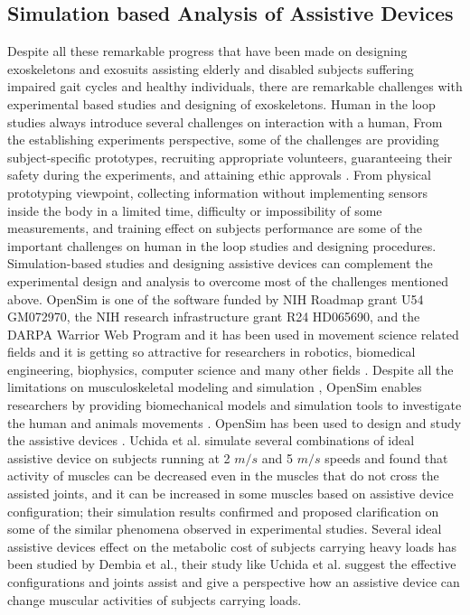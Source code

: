 \documentclass[10pt,letterpaper]{article}
\begin{document}
\subsection*{Simulation based Analysis of Assistive Devices}
Despite all these remarkable progress that have been made on designing exoskeletons and exosuits assisting elderly and disabled subjects suffering impaired gait cycles and healthy individuals, there are remarkable challenges with experimental based studies and designing of exoskeletons. Human in the loop studies always introduce several challenges on interaction with a human, From the establishing experiments perspective, some of the challenges are providing subject-specific prototypes, recruiting appropriate volunteers, guaranteeing their safety during the experiments, and attaining ethic approvals \cite{2}. From physical prototyping viewpoint, collecting information without implementing sensors inside the body in a limited time\cite{2}, difficulty or impossibility of some measurements\cite{89}, and training effect on subjects performance \cite{90,91} are some of the important challenges on human in the loop studies and designing procedures.\\
Simulation-based studies and designing assistive devices can complement the experimental design and analysis to overcome most of the challenges mentioned above. OpenSim is one of the software funded by NIH Roadmap grant U54 GM072970, the NIH research infrastructure grant R24 HD065690, and the DARPA Warrior Web Program and it has been used in movement science related fields\cite{89} and it is getting so attractive for researchers in robotics, biomedical engineering, biophysics, computer science and many other fields \cite{89,103}. Despite all the limitations on musculoskeletal modeling and simulation \cite{92}, OpenSim enables researchers by providing biomechanical models and simulation tools to investigate the human and animals movements \cite{89,103}. OpenSim has been used to design and study the assistive devices \cite{2,93,94,96}. Uchida et al. \cite{2} simulate several combinations of ideal assistive device on subjects running at 2 $m/s$ and 5 $m/s$ speeds and found that activity of muscles can be decreased even in the muscles that do not cross the assisted joints, and it can be increased in some muscles based on assistive device configuration; their simulation results confirmed and proposed clarification on some of the similar phenomena observed in experimental studies. Several ideal assistive devices effect on the metabolic cost of subjects carrying heavy loads has been studied by Dembia et al.\cite{93}, their study like Uchida et al. \cite{2} suggest the effective configurations and joints assist and give a perspective how an assistive device can change muscular activities of subjects carrying loads.\\
\end{document}
